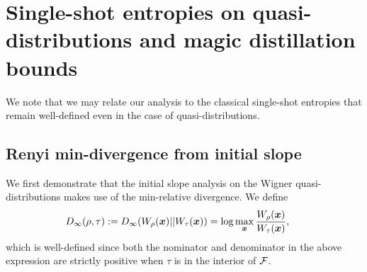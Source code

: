 \documentclass[pra,
aps,
twocolumn,
superscriptaddress,
groupedaddress,
nofootinbib,
reprint
]{revtex4-1}
\begin{document}
\newpage
\section{Single-shot entropies on quasi-distributions and magic distillation bounds}

We note that we may relate our analysis to the classical single-shot entropies that remain well-defined even in the case of quasi-distributions.

\subsection{Renyi min-divergence from initial slope}
We first demonstrate that the initial slope analysis on the Wigner quasi-distributions makes use of the min-relative divergence. We define 
\begin{equation}
	\hspace{-14pt}D_\infty(\rho,\tau) := D_\infty(W_\rho(\x) || W_\tau (\x)) = \log  \max_{\x} \frac{W_\rho(\x)}{W_\tau(\x)},
\end{equation}
which is well-defined since both the nominator and denominator in the above expression are strictly positive when $\tau$ is in the interior of ${\mathcal F}$.
\end{document}
